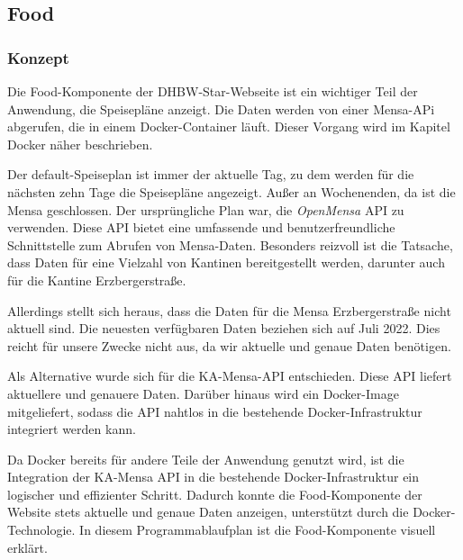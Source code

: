 \subsection{Food}
\subsubsection{Konzept}
Die Food-Komponente der DHBW-Star-Webseite ist ein wichtiger Teil der Anwendung, die Speisepläne anzeigt.
Die Daten werden von einer Mensa-APi abgerufen, die in einem Docker-Container läuft. Dieser Vorgang wird im Kapitel Docker näher beschrieben.

Der default-Speiseplan ist immer der aktuelle Tag, zu dem werden für die nächsten zehn Tage die Speisepläne angezeigt. Außer an Wochenenden, da ist die Mensa geschlossen.
Der ursprüngliche Plan war, die \emph{OpenMensa} API zu verwenden. Diese API bietet eine umfassende und benutzerfreundliche Schnittstelle zum Abrufen von Mensa-Daten. Besonders reizvoll ist die Tatsache, dass Daten für eine Vielzahl von Kantinen bereitgestellt werden, darunter auch für die Kantine Erzbergerstraße. \cite{openmensa}

Allerdings stellt sich heraus, dass die Daten für die Mensa Erzbergerstraße nicht aktuell sind. Die neuesten verfügbaren Daten beziehen sich auf Juli 2022. Dies reicht für unsere Zwecke nicht aus, da wir aktuelle und genaue Daten benötigen. \cite{openmensa-canteen33}

Als Alternative wurde sich für die KA-Mensa-API entschieden. Diese API liefert aktuellere und genauere Daten. Darüber hinaus wird ein Docker-Image mitgeliefert, sodass die API nahtlos in die bestehende Docker-Infrastruktur integriert werden kann.\cite{ka-mensa-api}

Da Docker bereits für andere Teile der Anwendung genutzt wird, ist die Integration der KA-Mensa API in die bestehende Docker-Infrastruktur ein logischer und effizienter Schritt. Dadurch konnte die Food-Komponente der Website stets aktuelle und genaue Daten anzeigen, unterstützt durch die Docker-Technologie.
In diesem Programmablaufplan ist die Food-Komponente visuell erklärt.

